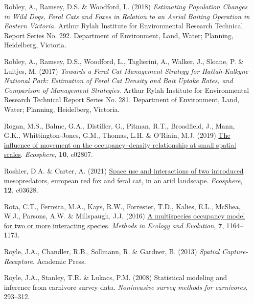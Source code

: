 \documentclass[11pt,a4paper,titlepage,twoside,openright]{style/unimelbthesis}
\newenvironment{CSLReferences}%
  {}%
  {\par}
\begin{document}
\begin{mainmatter}
\begin{CSLReferences}{1}{0}
\leavevmode{}%
Robley, A., Ramsey, D.S. \& Woodford, L. (2018) \emph{Estimating Population Changes in Wild Dogs, Feral Cats and Foxes in Relation to an Aerial Baiting Operation in Eastern {V}ictoria.} Arthur Rylah Institute for Environmental Research Technical Report Series No. 292. Department of Environment, Land, Water; Planning, Heidelberg, Victoria.

\leavevmode{}%
Robley, A., Ramsey, D.S., Woodford, L., Taglierini, A., Walker, J., Sloane, P. \& Luitjes, M. (2017) \emph{Towards a Feral Cat Management Strategy for {Hattah-Kulkyne National Park}: Estimation of Feral Cat Density and Bait Uptake Rates, and Comparison of Management Strategies}. Arthur Rylah Institute for Environmental Research Technical Report Series No. 281. Department of Environment, Land, Water; Planning, Heidelberg, Victoria.

\leavevmode{}%
Rogan, M.S., Balme, G.A., Distiller, G., Pitman, R.T., Broadfield, J., Mann, G.K., Whittington-Jones, G.M., Thomas, L.H. \& O'Riain, M.J. (2019) \href{https://doi.org/10.1002/ecs2.2807}{The influence of movement on the occupancy--density relationship at small spatial scales}. \emph{Ecosphere}, \textbf{10}, e02807.

\leavevmode{}%
Roshier, D.A. \& Carter, A. (2021) \href{https://doi.org/10.1002/ecs2.3628}{Space use and interactions of two introduced mesopredators, european red fox and feral cat, in an arid landscape}. \emph{Ecosphere}, \textbf{12}, e03628.

\leavevmode{}%
Rota, C.T., Ferreira, M.A., Kays, R.W., Forrester, T.D., Kalies, E.L., McShea, W.J., Parsons, A.W. \& Millspaugh, J.J. (2016) \href{https://doi.org/10.1111/2041-210X.12587}{A multispecies occupancy model for two or more interacting species}. \emph{Methods in Ecology and Evolution}, \textbf{7}, 1164--1173.

\leavevmode{}%
Royle, J.A., Chandler, R.B., Sollmann, R. \& Gardner, B. (2013) \emph{Spatial Capture-Recapture}. Academic Press.

\leavevmode{}%
Royle, J.A., Stanley, T.R. \& Lukacs, P.M. (2008) Statistical modeling and inference from carnivore survey data. \emph{Noninvasive survey methods for carnivores}, 293--312.


\end{CSLReferences}
\end{mainmatter}
\end{document}
